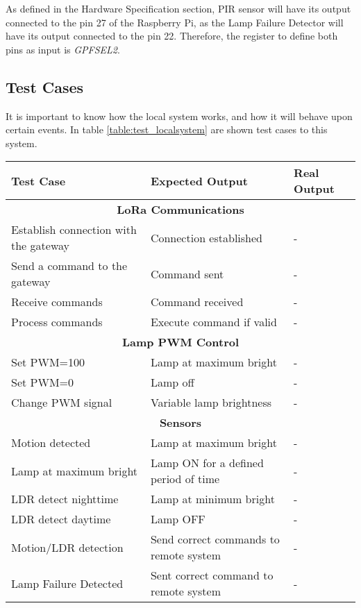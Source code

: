 As defined in the Hardware Specification section, PIR sensor will have its output connected to the pin 27 of the Raspberry Pi, as the Lamp Failure Detector will have its output connected to the pin 22. Therefore, the register to define both pins as input is \textit{GPFSEL2}.

\clearpage
\subsection{Test Cases}
It is important to know how the local system works, and how it will behave upon certain events. In table \ref{table:test_localsystem} are shown test cases to this system.

\begin{table}[H]
	\centering
	\resizebox{\columnwidth}{!}
	{
		\begin{tabular}{|m{4cm}|m{5cm}||m{5cm}|}
			\hline
			\textbf{Test Case} & \textbf{Expected Output} & \textbf{Real Output}
			\\\hline\hline
			\multicolumn{3}{c}{\textbf{LoRa Communications}}\\\hline
			Establish connection with the gateway & Connection established & - 
			\\\hline
			Send a command to the gateway & Command sent & -
			\\\hline
			Receive commands & Command received & -
			\\\hline
			Process commands & Execute command if valid & -
			\\\hline
			
			\multicolumn{3}{c}{\textbf{Lamp PWM Control}}\\\hline
			Set PWM=100 & Lamp at maximum bright & -
			\\\hline
			Set PWM=0 & Lamp off & -
			\\\hline
			Change PWM signal & Variable lamp brightness & -
			\\\hline
			
			\multicolumn{3}{c}{\textbf{Sensors}}\\\hline
			Motion detected & Lamp at maximum bright & -
			\\\hline
			Lamp at maximum bright & Lamp ON for a defined period of time & -
			\\\hline
			LDR detect nighttime & Lamp at minimum bright & -
			\\\hline
			LDR detect daytime & Lamp OFF & -
			\\\hline
			Motion/LDR detection & Send correct commands to remote system & -
			\\\hline
			Lamp Failure Detected & Sent correct command to remote system & -
			\\\hline
			

\end{tabular}}
\end{table}
